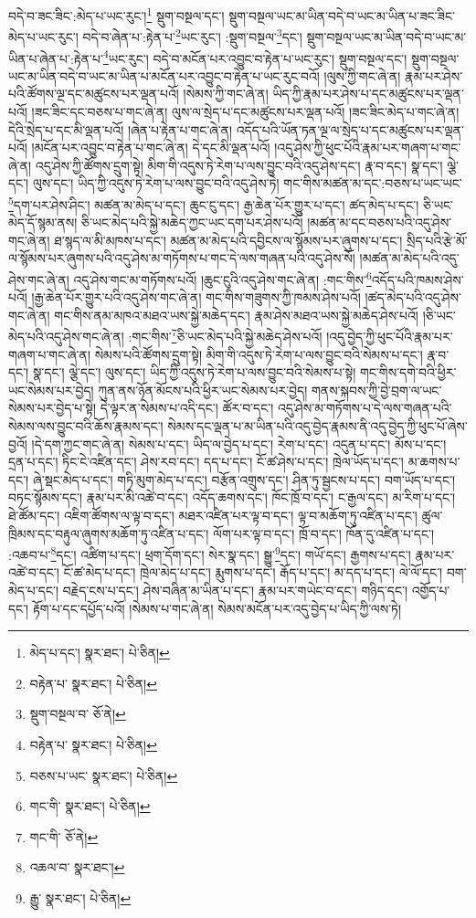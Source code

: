 བདེ་བ་ཟང་ཟིང་:མེད་པ་ཡང་རུང་།\footnote{མེད་པ་དང་།  སྣར་ཐང་།  པེ་ཅིན། } སྡུག་བསྔལ་དང་། སྡུག་བསྔལ་ཡང་མ་ཡིན་བདེ་བ་ཡང་མ་ཡིན་པ་ཟང་ཟིང་མེད་པ་ཡང་རུང་། བདེ་བ་ཞེན་པ་:རྟེན་པ་\footnote{བརྟེན་པ་  སྣར་ཐང་།  པེ་ཅིན། }ཡང་རུང་། :སྡུག་བསྔལ་\footnote{སྡུག་བསྔལ་བ་  ཅོ་ནེ། }དང་། སྡུག་བསྔལ་ཡང་མ་ཡིན་བདེ་བ་ཡང་མ་ཡིན་པ་ཞེན་པ་:རྟེན་པ་\footnote{བརྟེན་པ་  སྣར་ཐང་།  པེ་ཅིན། }ཡང་རུང་། བདེ་བ་མངོན་པར་འབྱུང་བ་རྟེན་པ་ཡང་རུང་། སྡུག་བསྔལ་དང་། སྡུག་བསྔལ་ཡང་མ་ཡིན་བདེ་བ་ཡང་མ་ཡིན་པ་མངོན་པར་འབྱུང་བ་རྟེན་པ་ཡང་རུང་བའོ། །ལུས་ཀྱི་གང་ཞེ་ན། རྣམ་པར་ཤེས་པའི་ཚོགས་ལྔ་དང་མཚུངས་པར་ལྡན་པའོ། །སེམས་ཀྱི་གང་ཞེ་ན། ཡིད་ཀྱི་རྣམ་པར་ཤེས་པ་དང་མཚུངས་པར་ལྡན་པའོ། །ཟང་ཟིང་དང་བཅས་པ་གང་ཞེ་ན། ལུས་ལ་སྲེད་པ་དང་མཚུངས་པར་ལྡན་པའོ། །ཟང་ཟིང་མེད་པ་གང་ཞེ་ན། དེའི་སྲེད་པ་དང་མི་ལྡན་པའོ། །ཞེན་པ་རྟེན་པ་གང་ཞེ་ན། འདོད་པའི་ཡོན་ཏན་ལྔ་ལ་སྲེད་པ་དང་མཚུངས་པར་ལྡན་པའོ། །མངོན་པར་འབྱུང་བ་རྟེན་པ་གང་ཞེ་ན། དེ་དང་མི་ལྡན་པའོ། །འདུ་ཤེས་ཀྱི་ཕུང་པོའི་རྣམ་པར་གཞག་པ་གང་ཞེ་ན། འདུ་ཤེས་ཀྱི་ཚོགས་དྲུག་སྟེ། མིག་གི་འདུས་ཏེ་རེག་པ་ལས་བྱུང་བའི་འདུ་ཤེས་དང་། རྣ་བ་དང་། སྣ་དང་། ལྕེ་དང་། ལུས་དང་། ཡིད་ཀྱི་འདུས་ཏེ་རེག་པ་ལས་བྱུང་བའི་འདུ་ཤེས་ཏེ། གང་གིས་མཚན་མ་དང་:བཅས་པ་ཡང་ཡང་\footnote{བཅས་པ་ཡང་  སྣར་ཐང་།  པེ་ཅིན། }དག་པར་ཤེས་ཤིང་། མཚན་མ་མེད་པ་དང་། ཆུང་ངུ་དང་། རྒྱ་ཆེན་པོར་གྱུར་པ་དང་། ཚད་མེད་པ་དང་། ཅི་ཡང་མེད་དོ་སྙམ་ནས། ཅི་ཡང་མེད་པའི་སྐྱེ་མཆེད་ཀྱང་ཡང་དག་པར་ཤེས་པའོ། །མཚན་མ་དང་བཅས་པའི་འདུ་ཤེས་གང་ཞེ་ན། ཐ་སྙད་ལ་མི་མཁས་པ་དང་། མཚན་མ་མེད་པའི་དབྱིངས་ལ་སྙོམས་པར་ཞུགས་པ་དང་། སྲིད་པའི་རྩེ་མོ་ལ་སྙོམས་པར་ཞུགས་པའི་འདུ་ཤེས་མ་གཏོགས་པ་གང་དེ་ལས་གཞན་པའི་འདུ་ཤེས་སོ། །མཚན་མ་མེད་པའི་འདུ་ཤེས་གང་ཞེ་ན། འདུ་ཤེས་གང་མ་གཏོགས་པའོ། །ཆུང་ངུའི་འདུ་ཤེས་གང་ཞེ་ན། :གང་གིས་\footnote{གང་གི་  སྣར་ཐང་།  པེ་ཅིན། }འདོད་པའི་ཁམས་ཤེས་པའོ། །རྒྱ་ཆེན་པོར་གྱུར་པའི་འདུ་ཤེས་གང་ཞེ་ན། གང་གིས་གཟུགས་ཀྱི་ཁམས་ཤེས་པའོ། །ཚད་མེད་པའི་འདུ་ཤེས་གང་ཞེ་ན། གང་གིས་ནམ་མཁའ་མཐའ་ཡས་སྐྱེ་མཆེད་དང་། རྣམ་ཤེས་མཐའ་ཡས་སྐྱེ་མཆེད་ཤེས་པའོ། །ཅི་ཡང་མེད་པའི་འདུ་ཤེས་གང་ཞེ་ན། :གང་གིས་\footnote{གང་གི་  ཅོ་ནེ། }ཅི་ཡང་མེད་པའི་སྐྱེ་མཆེད་ཤེས་པའོ། །འདུ་བྱེད་ཀྱི་ཕུང་པོའི་རྣམ་པར་གཞག་པ་གང་ཞེ་ན། སེམས་པའི་ཚོགས་དྲུག་སྟེ། མིག་གི་འདུས་ཏེ་རེག་པ་ལས་བྱུང་བའི་སེམས་པ་དང་། རྣ་བ་དང་། སྣ་དང་། ལྕེ་དང་། ལུས་དང་། ཡིད་ཀྱི་འདུས་ཏེ་རེག་པ་ལས་བྱུང་བའི་སེམས་པ་སྟེ། གང་གིས་དགེ་བའི་ཕྱིར་ཡང་སེམས་པར་བྱེད། ཀུན་ནས་ཉོན་མོངས་པའི་ཕྱིར་ཡང་སེམས་པར་བྱེད། གནས་སྐབས་ཀྱི་བྱེ་བྲག་ལ་ཡང་སེམས་པར་བྱེད་པ་སྟེ། དེ་ལྟར་ན་སེམས་པ་འདི་དང་། ཚོར་བ་དང་། འདུ་ཤེས་མ་གཏོགས་པ་དེ་ལས་གཞན་པའི་སེམས་ལས་བྱུང་བའི་ཆོས་རྣམས་དང་། སེམས་དང་ལྡན་པ་མ་ཡིན་པའི་འདུ་བྱེད་རྣམས་ནི་འདུ་བྱེད་ཀྱི་ཕུང་པོ་ཞེས་བྱའོ། །དེ་དག་ཀྱང་གང་ཞེ་ན། སེམས་པ་དང་། ཡིད་ལ་བྱེད་པ་དང་། རེག་པ་དང་། འདུན་པ་དང་། མོས་པ་དང་། དྲན་པ་དང་། ཏིང་ངེ་འཛིན་དང་། ཤེས་རབ་དང་། དད་པ་དང་། ངོ་ཚ་ཤེས་པ་དང་། ཁྲེལ་ཡོད་པ་དང་། མ་ཆགས་པ་དང་། ཞེ་སྡང་མེད་པ་དང་། གཏི་མུག་མེད་པ་དང་། བརྩོན་འགྲུས་དང་། ཤིན་ཏུ་སྦྱངས་པ་དང་། བག་ཡོད་པ་དང་། བཏང་སྙོམས་དང་། རྣམ་པར་མི་འཚེ་བ་དང་། འདོད་ཆགས་དང་། ཁོང་ཁྲོ་བ་དང་། ང་རྒྱལ་དང་། མ་རིག་པ་དང་། ཐེ་ཚོམ་དང་། འཇིག་ཚོགས་ལ་ལྟ་བ་དང་། མཐར་འཛིན་པར་ལྟ་བ་དང་། ལྟ་བ་མཆོག་ཏུ་འཛིན་པ་དང་། ཚུལ་ཁྲིམས་དང་བརྟུལ་ཞུགས་མཆོག་ཏུ་འཛིན་པ་དང་། ལོག་པར་ལྟ་བ་དང་། ཁྲོ་བ་དང་། ཁོན་དུ་འཛིན་པ་དང་། :འཆབ་པ་\footnote{འཆལ་བ་  སྣར་ཐང་། }དང་། འཚིག་པ་དང་། ཕྲག་དོག་དང་། སེར་སྣ་དང་། སྒྱུ་\footnote{རྒྱུ་  སྣར་ཐང་།  པེ་ཅིན། }དང་། གཡོ་དང་། རྒྱགས་པ་དང་། རྣམ་པར་འཚེ་བ་དང་། ངོ་ཚ་མེད་པ་དང་། ཁྲེལ་མེད་པ་དང་། རྨུགས་པ་དང་། རྒོད་པ་དང་། མ་དད་པ་དང་། ལེ་ལོ་དང་། བག་མེད་པ་དང་། བརྗེད་ངས་པ་དང་། ཤེས་བཞིན་མ་ཡིན་པ་དང་། རྣམ་པར་གཡེང་བ་དང་། གཉིད་དང་། འགྱོད་པ་དང་། རྟོག་པ་དང་དཔྱོད་པའོ། །སེམས་པ་གང་ཞེ་ན། སེམས་མངོན་པར་འདུ་བྱེད་པ་ཡིད་ཀྱི་ལས་ཏེ། 